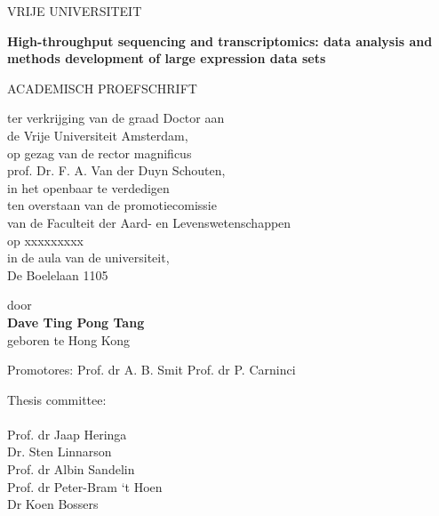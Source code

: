 \documentclass[10pt,a4paper]{report}
\begin{document}
\begin{titlepage}
   \begin{center}
      VRIJE UNIVERSITEIT

      \vspace{1.5cm}

      \fontsize{17}{1em}\selectfont \textbf{High-throughput sequencing and transcriptomics: data analysis and methods development of large expression data sets}

      \vspace{3cm}

      \fontsize{11}{1em}\selectfont
ACADEMISCH PROEFSCHRIFT

      \vspace{8mm}

ter verkrijging van de graad Doctor aan \\
de Vrije Universiteit Amsterdam, \\
op gezag van de rector magnificus \\
prof. Dr. F. A. Van der Duyn Schouten, \\
in het openbaar te verdedigen \\
ten overstaan van de promotiecomissie \\
van de Faculteit der Aard- en Levenswetenschappen \\
op xxxxxxxxx \\
in de aula van de universiteit, \\
De Boelelaan 1105 \\

      \vfill

      \normalsize
      door \\

      \fontsize{16}{2em}\selectfont \textbf{Dave Ting Pong Tang} \\
      \normalsize
      \vspace{1mm}
      geboren te Hong Kong

   \end{center}
\end{titlepage}

\fontsize{13}{1.5em}\selectfont

\noindent
Promotores:
\tabto{3cm} Prof. dr A. B. Smit
\tabto{3cm} Prof. dr P. Carninci

\newpage

{
   \setlength{\parindent}{0cm}
   Thesis committee:
   \\
   \\
   Prof. dr Jaap Heringa \\
   Dr. Sten Linnarson \\
   Prof. dr Albin Sandelin \\
   Prof. dr Peter-Bram `t Hoen \\
   Dr Koen Bossers \\
}
\end{document}
